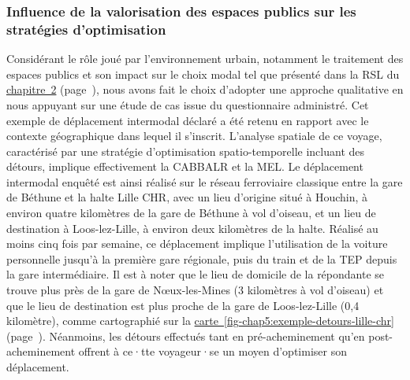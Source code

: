 \begin{refsegment}
\subsubsection*{Influence de la valorisation des espaces publics sur les stratégies d'optimisation
    \label{chap5:environnement-urbain}
    }

Considérant le rôle joué par l'environnement urbain, notamment le traitement des espaces publics et son impact sur le choix modal tel que présenté dans la \acrfull{RSL} du \hyperref[chap2:titre]{chapitre~2} (page~\pageref{chap2:titre}), nous avons fait le choix d'adopter une approche qualitative en nous appuyant sur une étude de cas issue du questionnaire administré. Cet exemple de déplacement intermodal déclaré a été retenu en rapport avec le contexte géographique dans lequel il s'inscrit. L'analyse spatiale de ce voyage, caractérisé par une stratégie d'optimisation spatio-temporelle incluant des détours, implique effectivement la \acrshort{CABBALR} et la \acrshort{MEL}. Le déplacement intermodal enquêté est ainsi réalisé sur le réseau ferroviaire classique entre la gare de Béthune et la halte Lille CHR, avec un lieu d'origine situé à Houchin, à environ quatre kilomètres de la gare de Béthune à vol d'oiseau, et un lieu de destination à Loos-lez-Lille, à environ deux kilomètres de la halte. Réalisé au moins cinq fois par semaine, ce déplacement implique l'utilisation de la voiture personnelle jusqu'à la première gare régionale, puis du train et de la \acrshort{TEP} depuis la gare intermédiaire. Il est à noter que le lieu de domicile de la répondante se trouve plus près de la gare de Nœux-les-Mines (3 kilomètres à vol d'oiseau) et que le lieu de destination est plus proche de la gare de Loos-lez-Lille (0,4 kilomètre), comme cartographié sur la \hyperref[fig-chap5:exemple-detours-lille-chr]{carte~\ref{fig-chap5:exemple-detours-lille-chr}} (page~\pageref{fig-chap5:exemple-detours-lille-chr}). Néanmoins, les détours effectués tant en pré-acheminement qu'en post-acheminement offrent à ce·tte voyageur·se un moyen d'optimiser son déplacement.%


\end{refsegment}
